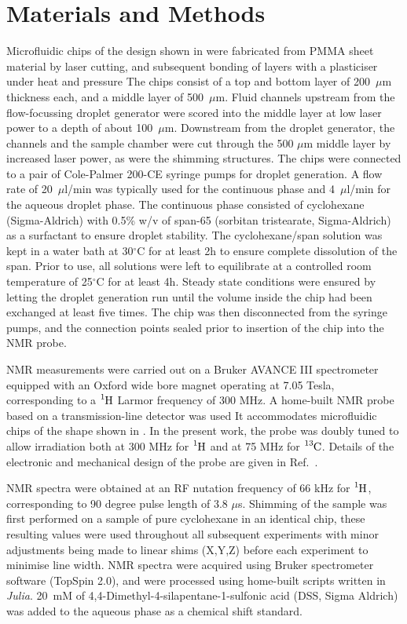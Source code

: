 \section{Materials and Methods}

Microfluidic chips of the design shown in 
were fabricated from PMMA sheet material by
laser cutting, and subsequent bonding of layers with a plasticiser
under heat and pressure\citep{Yilmaz:2016fx} The chips consist of a
top and bottom layer of 200~$\mu$m thickness each, and a middle layer of
500~$\mu$m. Fluid channels upstream from the flow-focussing droplet
generator were scored into the middle layer at low laser power to a depth
of about 100~$\mu$m. Downstream from the droplet generator, the channels and
the sample chamber were cut through the 500 $\mu$m middle layer by increased
laser power, as were the shimming structures. The chips were connected to
a pair of Cole-Palmer 200-CE syringe pumps for droplet generation.
A flow rate of 20~$\mu$l/min was typically used for the continuous
phase and 4~$\mu$l/min for the aqueous droplet phase.
The continuous phase consisted of cyclohexane (Sigma-Aldrich)
with 0.5\% w/v of span-65 (sorbitan
tristearate, Sigma-Aldrich) as a surfactant to ensure droplet stability.
The cyclohexane/span solution was kept in a water bath at 30$^\circ$C
for at least 2h to ensure complete dissolution of the span.
Prior to use, all solutions were left to equilibrate at a controlled room temperature
of 25$^\circ$C for at least 4h.
Steady state conditions were ensured by letting the droplet generation run until
the volume inside the chip had been exchanged at least five times. The
chip was then disconnected from the syringe pumps, and the connection
points sealed prior to insertion of the chip into the NMR probe.

NMR measurements were carried out on a Bruker AVANCE III
spectrometer equipped with an Oxford wide bore magnet operating at 7.05 Tesla,
corresponding to a $\ce{^1H}$ Larmor frequency of 300 MHz. A home-built NMR probe
based on a transmission-line detector was used\citep{Finch:2016gv}
It accommodates microfluidic chips of the shape shown in .
In the present work, the probe was doubly
tuned to allow irradiation both at 300 MHz for $\ce{^1H}$ and at 75 MHz for
$\ce{^{13}C}$. Details of the electronic and mechanical design of the
probe are given in Ref.~\citep{Finch:2017vb}.

NMR spectra were obtained at an RF nutation frequency of 66 kHz for
$\ce{^1H}$, corresponding to 90 degree pulse length of
3.8 $\mu$s. Shimming of the sample was first performed on a sample of pure cyclohexane
in an identical chip, these resulting values were used throughout all subsequent experiments with
minor adjustments being made to linear shims (X,Y,Z) before each experiment to minimise line width. NMR spectra were acquired using Bruker spectrometer software (TopSpin 2.0),
and were processed using home-built scripts written in \textit{Julia}.\citep{Bezanson:2017gd}
20~mM of 4,4-Dimethyl-4-silapentane-1-sulfonic acid (DSS, Sigma Aldrich) was added to the aqueous phase
as a chemical shift standard.

